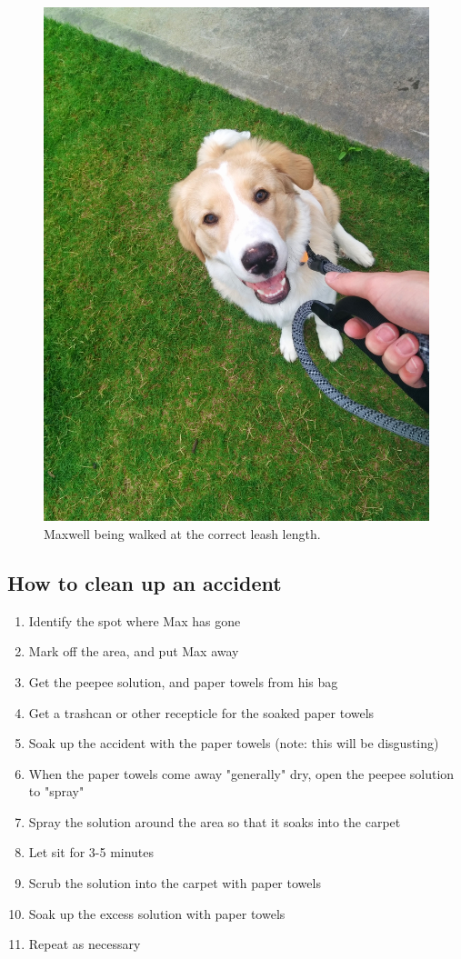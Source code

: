 \documentclass[pdftex,12pt]{article}
\begin{document}
\begin{figure}[H]
    \centering
    \includegraphics[width=.35\textwidth]{./images/how_to/walk_max/short_leash.jpg}
    \caption{Maxwell being walked at the correct leash length.}
    \label{fig:short_leash}
\end{figure}

\subsection{How to clean up an accident}
\begin{enumerate}\label{itm:how_to_clean_accident}
    \item Identify the spot where Max has gone
    \item Mark off the area, and put Max away
    \item Get the peepee solution, and paper towels from his bag
    \item Get a trashcan or other recepticle for the soaked paper towels
    \item Soak up the accident with the paper towels (note: this will be disgusting)
    \item When the paper towels come away "generally" dry, open the peepee solution to "spray"
    \item Spray the solution around the area so that it soaks into the carpet
    \item Let sit for 3-5 minutes
    \item Scrub the solution into the carpet with paper towels
    \item Soak up the excess solution with paper towels
    \item Repeat as necessary
\end{enumerate}
\end{document}
